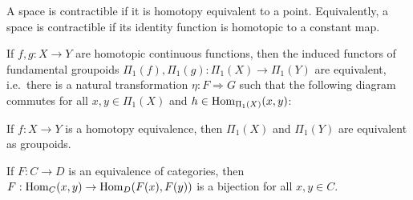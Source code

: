 \documentclass[a5paper]{article}
\begin{document}
\begin{definition*}
	A space is contractible if it is homotopy equivalent to a point. Equivalently,
  a space is contractible if its identity function is homotopic to a constant map.
\end{definition*}


\begin{proposition*}
	If $f,g:X\to Y$ are homotopic continuous functions, then the induced functors
  of fundamental groupoids $\Pi_1(f),\Pi_1(g):\Pi_1(X)\to\Pi_1(Y)$ are
  equivalent, i.e.\ there is a natural transformation $\eta:F\Rightarrow G$ such
  that the following diagram commutes for all $x,y\in \Pi_1(X)$ and
  $h\in\operatorname{Hom}_{\Pi_1(X)}(x,y)$:
  \begin{center}
  \end{center}
\end{proposition*}


\begin{corollary*}
	If $f:X\to Y$ is a homotopy equivalence, then $\Pi_1(X)$  and $\Pi_1(Y)$ are
  equivalent as groupoids.
\end{corollary*}


\begin{proposition*}
	If $F:C\to D$ is an equivalence of categories, then
  $F:\operatorname{Hom}_C(x,y)\to \operatorname{Hom}_D(F(x),F(y))$ is a bijection for all $x,y\in C$.
\end{proposition*}
\end{document}
